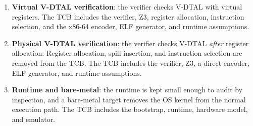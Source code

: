 \begin{enumerate}
  \item \textbf{Virtual V-DTAL verification}: the verifier checks V-DTAL with virtual registers. The TCB includes the verifier, Z3, register allocation, instruction selection, and the x86-64 encoder, ELF generator, and runtime assumptions.
  \item \textbf{Physical V-DTAL verification}: the verifier checks V-DTAL \textit{after} register allocation. Register allocation, spill insertion, and instruction selection are removed from the TCB. The TCB includes the verifier, Z3, a direct encoder, ELF generator, and runtime assumptions.
  \item \textbf{Runtime and bare-metal}: the runtime is kept small enough to audit by inspection, and a bare-metal target removes the OS kernel from the normal execution path. The TCB includes the bootstrap, runtime, hardware model, and emulator.
\end{enumerate}

